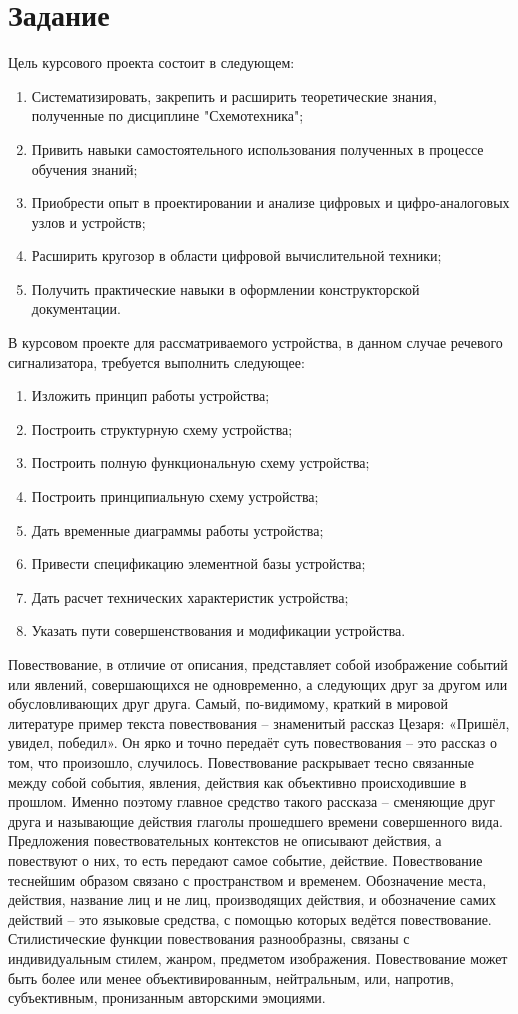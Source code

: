 \section{Задание}
Цель курсового проекта состоит в следующем: 
\begin{enumerate}
	\item Систематизировать, закрепить и расширить теоретические знания, полученные по дисциплине "Схемотехника"; 
	\item Привить навыки самостоятельного использования полученных в процессе обучения знаний; 
	\item Приобрести опыт в проектировании и анализе цифровых и цифро-аналоговых узлов и устройств; 
	\item Расширить кругозор в области цифровой вычислительной техники; 
	\item Получить практические навыки в оформлении конструкторской документации. 
\end{enumerate}

В курсовом проекте для рассматриваемого устройства, в данном случае речевого сигнализатора, требуется выполнить следующее: 

\begin{enumerate}
		\item Изложить принцип работы устройства; 
		\item Построить структурную схему устройства; 
		\item Построить полную функциональную схему устройства; 
		\item Построить принципиальную схему устройства; 
		\item Дать временные диаграммы работы устройства; 
		\item Привести спецификацию элементной базы устройства; 
		\item Дать расчет технических характеристик устройства; 
		\item Указать пути совершенствования и модификации устройства.
\end{enumerate}

Повествование, в отличие от описания, представляет собой изображение событий или явлений, совершающихся не одновременно, а следующих друг за другом или обусловливающих друг друга. Самый, по-видимому, краткий в мировой литературе пример текста повествования – знаменитый рассказ Цезаря: «Пришёл, увидел, победил». Он ярко и точно передаёт суть повествования – это рассказ о том, что произошло, случилось.
Повествование раскрывает тесно связанные между собой события, явления, действия как объективно происходившие в прошлом. Именно поэтому главное средство такого рассказа – сменяющие друг друга и называющие действия глаголы прошедшего времени совершенного вида. Предложения повествовательных контекстов не описывают действия, а повествуют о них, то есть передают самое событие, действие.
Повествование теснейшим образом связано с пространством и временем. Обозначение места, действия, название лиц и не лиц, производящих действия, и обозначение самих действий – это языковые средства, с помощью которых ведётся повествование.
Стилистические функции повествования разнообразны, связаны с индивидуальным стилем, жанром, предметом изображения. Повествование может быть более или менее объективированным, нейтральным, или, напротив, субъективным, пронизанным авторскими эмоциями.
	
